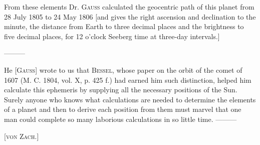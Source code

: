 \indent From these elements Dr. \textsc{Gauss} calculated the geocentric path of this planet from 28 July 1805 to 24 May 1806 [and gives the right ascension and declination to the minute, the distance from Earth to three decimal places and the brightness to five decimal places, for 12 o’clock Seeberg time at three-day intervals.]

—\quad—\quad—

He [\textsc{Gauss}] wrote to us that \textsc{Bessel}, whose paper on the orbit of the comet of 1607 (M. C. 1804, vol. X, p. 425 f.) had earned him such distinction, helped him calculate this ephemeris by supplying all the necessary positions of the Sun. Surely anyone who knows what calculations are needed to determine the elements of a planet and then to derive each position from them must marvel that one man could complete so many laborious calculations in so little time. —\quad—\quad—

\hfill[\textsc{von Zach.}]
